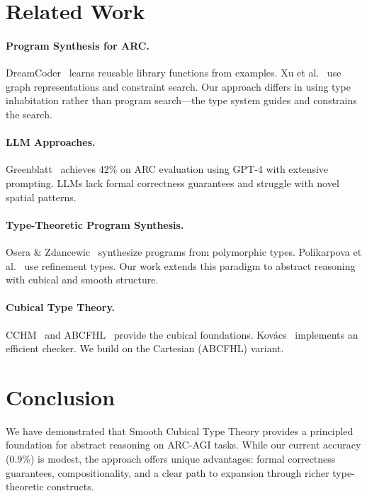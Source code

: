 \documentclass[11pt,a4paper]{article}
\begin{document}
\section{Related Work}
\label{sec:related}

\paragraph{Program Synthesis for ARC.}
DreamCoder~\cite{Ellis2021} learns reusable library
functions from examples.  Xu et al.~\cite{xu2023arc} use graph
representations and constraint search.  Our approach differs in using
type inhabitation rather than program search---the type system guides
and constrains the search.

\paragraph{LLM Approaches.}
Greenblatt~\cite{Greenblatt2024} achieves 42\% on ARC evaluation
using GPT-4 with extensive prompting.  LLMs lack formal correctness
guarantees and struggle with novel spatial patterns.

\paragraph{Type-Theoretic Program Synthesis.}
Osera \& Zdancewic~\cite{Osera2015} synthesize programs from
polymorphic types.  Polikarpova et al.~\cite{Polikarpova2016}
use refinement types.  Our work extends this paradigm to abstract
reasoning with cubical and smooth structure.

\paragraph{Cubical Type Theory.}
CCHM~\cite{CCHM2018} and ABCFHL~\cite{ABCFHL2021} provide the
cubical foundations.  Kov\'{a}cs~\cite{Kovacs2024cctt} implements an
efficient checker.  We build on the Cartesian (ABCFHL) variant.

\section{Conclusion}
\label{sec:conclusion}

We have demonstrated that Smooth Cubical Type Theory provides a
principled foundation for abstract reasoning on ARC-AGI tasks.  While
our current accuracy (0.9\%) is modest, the approach offers unique
advantages: formal correctness guarantees, compositionality, and a
clear path to expansion through richer type-theoretic constructs.
\end{document}
